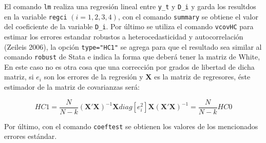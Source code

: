 \documentclass[]{article}
\begin{document}
El comando \texttt{lm} realiza una regresión lineal entre \texttt{y\_t}
y \texttt{D\_i} y garda los resultdos en la variable \texttt{regci}
$(i=1, 2, 3, 4)$, con el comando \texttt{summary} se obtiene el valor
del coeficiente de la variable \texttt{D\_i}. Por último se utiliza el
comando \texttt{vcovHC} para estimar los errores estandar robustos a
heterocedasticidad y autocorrelación (Zeileis 2006), la opción
\texttt{type="HC1"} se agrega para que el resultado sea similar al
comando \texttt{robust} de Stata e indica la forma que deberá tener la
matriz de White, En este caso no es otra cosa que una corrección por
grados de libertad de dicha matriz, si $e_{i}$ son los errores de la
regresión y $\mathbf{X}$ es la matriz de regresores, éste estimador de
la matriz de covarianzas será:

\[ HC1=\frac{N}{N-k}(\mathbf{X}'\mathbf{X})^{-1}\mathbf{X}diag[e_{i}^{2}]\mathbf{X}(\mathbf{X}'\mathbf{X})^{-1}=\frac{N}{N-k}HC0 \]

Por último, con el comando \texttt{coeftest} se obtienen los valores de
los mencionados errores estándar.
\end{document}
